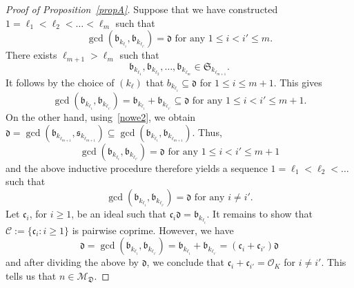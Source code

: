 \documentclass[leqno,a4paper,12pt]{article}
\theoremstyle{definition}
\newcommand{\OK}{\mathcal{O}_K}
\begin{document}
\begin{proof}[Proof of Proposition~\ref{propA}]
Suppose that we have constructed $1=\ell_1<\ell_2<\ldots<\ell_m$ such that
\begin{equation}\label{nowe1}
\gcd(\mathfrak{b}_{k_{\ell_i}},\mathfrak{b}_{k_{\ell_{i'}}})=\mathfrak{d} \text{ for any }1\leq i<i'\leq m.
\end{equation}
There exists $\ell_{m+1}>\ell_m$ such that
\begin{equation}\label{nowe2}
\mathfrak{b}_{k_{\ell_1}},\mathfrak{b}_{k_{\ell_2}},\dots,\mathfrak{b}_{k_{\ell_m}}\in \mathfrak{S}_{k_{\ell_{m+1}}}.
\end{equation}
It follows by the choice of $(k_\ell)$ that $b_{k_{\ell_i}}\subseteq \mathfrak{d}$ for $1\leq i\leq m+1$. This gives
\[
\gcd(\mathfrak{b}_{k_{\ell_i}},\mathfrak{b}_{k_{\ell_{i'}}})=\mathfrak{b}_{k_{\ell_i}}+\mathfrak{b}_{k_{\ell_{i'}}}\subseteq\mathfrak{d} \text{ for any }1\leq i<i'\leq m+1.
\]
On the other hand, using~\eqref{nowe2}, we obtain $\mathfrak{d}=\gcd(\mathfrak{b}_{k_{\ell_{m+1}}},\mathfrak{s}_{k_{\ell_{m+1}}})\subseteq\gcd(\mathfrak{b}_{k_{\ell_i}},\mathfrak{b}_{k_{\ell_{m+1}}})$.
Thus,
\[
\gcd(\mathfrak{b}_{k_{\ell_i}},\mathfrak{b}_{k_{\ell_{i'}}})=\mathfrak{d} \text{ for any }1\leq i<i'\leq m+1
\]
and the above inductive procedure therefore yields a sequence $1=\ell_1<\ell_2<\dots$ such that
\[
\gcd(\mathfrak{b}_{k_{\ell_i}},\mathfrak{b}_{k_{\ell_{i'}}})=\mathfrak{d} \text{ for any }i\neq i'.
\]
Let $\mathfrak{c}_i$, for $i\geq 1$, be an ideal such that $\mathfrak{c}_i\mathfrak{d}=\mathfrak{b}_{k_{\ell_i}}$. It remains to show that $\mathcal{C}:=\{\mathfrak{c}_i : i\geq 1\}$ is pairwise coprime. However, we have
\[
\mathfrak{d}=\gcd(\mathfrak{b}_{k_{\ell_i}},\mathfrak{b}_{k_{\ell_{i'}}})=\mathfrak{b}_{k_{\ell_i}}+\mathfrak{b}_{k_{\ell_{i'}}}=(\mathfrak{c}_i+\mathfrak{c}_{i'})\mathfrak{d}
\]
and after dividing the above by $\mathfrak{d}$, we conclude that $\mathfrak{c}_i+\mathfrak{c}_{i'}=\OK$ for $i\neq i'$. This tells us that $n\in\mathcal{M}_\mathfrak{D}$.


\end{proof}
\end{document}
